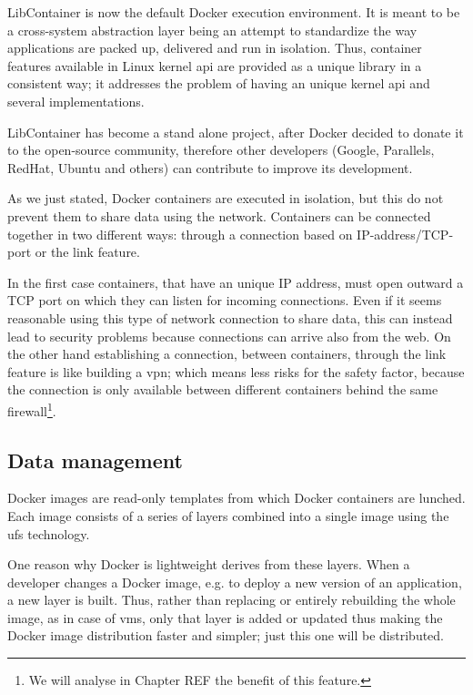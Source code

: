 LibContainer is now the default Docker execution environment. It is meant to be a cross-system abstraction
layer being an attempt to standardize the way applications are packed up, delivered and run in isolation.
Thus, container features available in Linux kernel \acs{api} are provided as a unique library in a
consistent way; it addresses the problem of having an unique kernel \acs{api} and several implementations.

LibContainer has become a stand alone project, after Docker decided to donate it to the open-source community,
therefore other developers (Google, Parallels, RedHat, Ubuntu and others) can contribute to improve its development.

As we just stated, Docker containers are executed in isolation, but this do not prevent them to share data using
the network. Containers can be connected together in two different ways: through a connection based on 
IP-address/TCP-port or the link feature.

In the first case containers, that have an unique IP address, must open outward a TCP port on which they can
listen for incoming connections. Even if it seems reasonable using this type of network connection to share
data, this can instead lead to security problems because connections can arrive also from the web. On the other
hand establishing a connection, between containers, through the link feature is like building a \ac{vpn};
which means less risks for the safety factor, because the connection is only available between different
containers behind the same firewall\footnote{We will analyse in Chapter REF the benefit of this feature.}.

\subsection{Data management}
\label{sec:background-docker-dataManagement}
Docker images are read-only templates from which Docker containers are lunched. Each image consists of
a series of layers combined into a single image using the \acf{ufs} technology.

One reason why Docker is lightweight derives from these layers. When a developer changes a Docker image,
e.g. to deploy a new version of an application, a new layer is built. Thus, rather than replacing
or entirely rebuilding the whole image, as in case of \ac{vm}s, only that layer is added or updated thus
making the Docker image distribution faster and simpler; just this one will be distributed.

